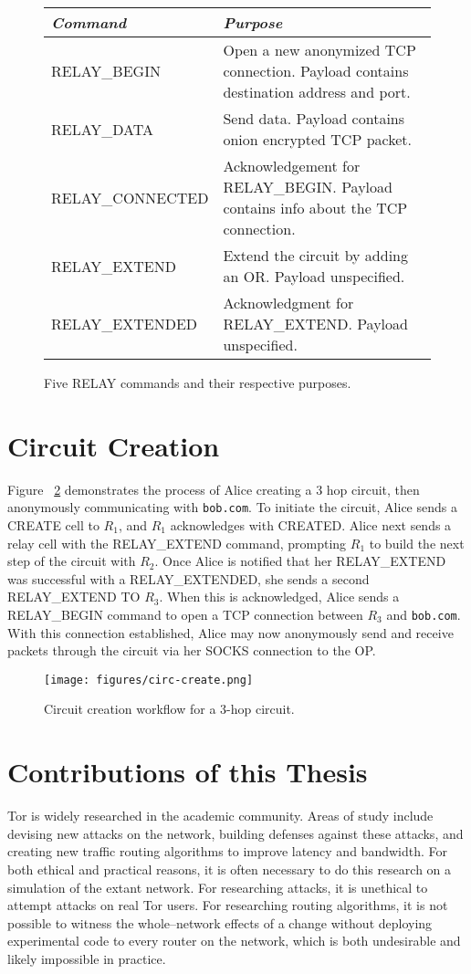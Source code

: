 \begin{figure}
	\begin{tabular}{| l | p{9cm} |}
		\hline
		\textit{Command} & \textit{Purpose} \\ \hline
		RELAY\_BEGIN & Open a new anonymized TCP connection. Payload contains destination address and port. \\ \hline
		RELAY\_DATA & Send data. Payload contains onion encrypted TCP packet. \\ \hline
		RELAY\_CONNECTED & Acknowledgement for RELAY\_BEGIN. Payload contains info about the TCP connection. \\ \hline
		RELAY\_EXTEND & Extend the circuit by adding an OR. Payload unspecified. \\ \hline
		RELAY\_EXTENDED & Acknowledgment for RELAY\_EXTEND. Payload unspecified. \\
		\hline
	\end{tabular}
	\caption{Five RELAY commands and their respective purposes.}
	\label{fig:relaycommands}
\end{figure}

\section{Circuit Creation}
Figure ~\ref{fig:circcreate} demonstrates the process of Alice creating a 3 hop circuit, then anonymously communicating with \texttt{bob.com}. To initiate the circuit, Alice sends a CREATE cell to $R_1$, and $R_1$ acknowledges with CREATED. Alice next sends a relay cell with the RELAY\_EXTEND command, prompting $R_1$ to build the next step of the circuit with $R_2$. Once Alice is notified that her RELAY\_EXTEND was successful with a RELAY\_EXTENDED, she sends a second RELAY\_EXTEND TO $R_3$. When this is acknowledged, Alice sends a RELAY\_BEGIN command to open a TCP connection between $R_3$ and \texttt{bob.com}. With this connection established, Alice may now anonymously send and receive packets through the circuit via her SOCKS connection to the OP.
\begin{figure}
	\centerline{\texttt{[image: figures/circ-create.png]}}
	\caption{Circuit creation workflow for a 3-hop circuit.}
	\label{fig:circcreate}
\end{figure}

\section{Contributions of this Thesis}
Tor is widely researched in the academic community. Areas of study include devising new attacks on the network, building defenses against these attacks, and creating new traffic routing algorithms to improve latency and bandwidth. For both ethical and practical reasons, it is often necessary to do this research on a simulation of the extant network. For researching attacks, it is unethical to attempt attacks on real Tor users. For researching routing algorithms, it is not possible to witness the whole--network effects of a change without deploying experimental code to every router on the network, which is both undesirable and likely impossible in practice.

